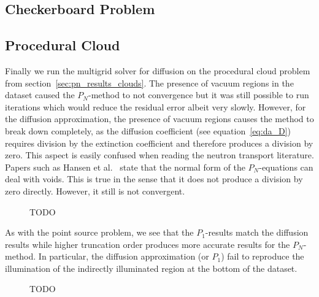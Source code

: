 \subsection{Checkerboard Problem}
\label{sec:da_results_checkerboard}

\subsection{Procedural Cloud}
\label{sec:da_results_clouds}

Finally we run the multigrid solver for diffusion on the procedural cloud problem from section~\ref{sec:pn_results_clouds}. The presence of vacuum regions in the dataset caused the $P_N$-method to not convergence but it was still possible to run iterations which would reduce the residual error albeit very slowly. However, for the diffusion approximation, the presence of vacuum regions causes the method to break down completely, as the diffusion coefficient (see equation~\ref{eq:da_D}) requires division by the extinction coefficient and therefore produces a division by zero. This aspect is easily confused when reading the neutron transport literature. Papers such as Hansen et al.~\cite{Hansen14} state that the normal form of the $P_N$-equations can deal with voids. This is true in the sense that it does not produce a division by zero directly. However, it still is not convergent.

\begin{figure}[h]
\centering
{}
\caption{TODO}
\label{fig:da_results_nebulae_1}
\end{figure}

As with the point source problem, we see that the $P_1$-results match the diffusion results while higher truncation order produces more accurate results for the $P_N$-method. In particular, the diffusion approximation (or $P_1$) fail to reproduce the illumination of the indirectly illuminated region at the bottom of the dataset.
\begin{figure}[h]
\centering
{}
\caption{TODO}
\label{fig:da_results_nebulae_2}
\end{figure}
